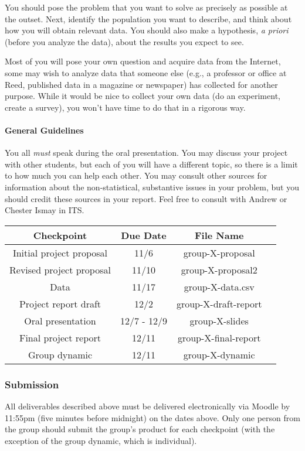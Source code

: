 \documentclass[10pt]{article}
\begin{document}
	You should pose the problem that you want to solve as precisely as possible at the outset. Next, identify the population you want to describe, and think about how you will obtain relevant data. You should also make a hypothesis, \emph{a priori} (before you analyze the data), about the results you expect to see.

	Most of you will pose your own question and acquire data from the Internet, some may wish to analyze data that someone else (e.g., a professor or office at Reed, published data in a magazine or newspaper) has collected for another purpose. While it would be nice to collect your own data (do an experiment, create a survey), you won't have time to do that in a rigorous way.
	
\paragraph{General Guidelines}
You all \emph{must} speak during the oral presentation. You may discuss your project with other students, but each of you will have a different topic, so there is a limit to how much you can help each other. You may consult other sources for information about the non-statistical, substantive issues in your problem, but you should credit these sources in your report. Feel free to consult with Andrew or Chester Ismay in ITS.

\newpage

\begin{table}
	\centering
\begin{tabular}{cccl}
	Checkpoint		&	Due Date	&	File Name \\
	\hline
	Initial project proposal	& 11/6 	&  group-X-proposal \\
	Revised project proposal	& 11/10	& group-X-proposal2 \\
	Data & 11/17	& group-X-data.csv \\
	Project report draft & 12/2 & group-X-draft-report \\
	Oral presentation	& 12/7 - 12/9	& group-X-slides \\
	Final project report	& 12/11	& group-X-final-report \\
	Group dynamic	& 12/11	& group-X-dynamic \\
	\hline
\end{tabular}
\end{table}

\subsubsection*{Submission}
All deliverables described above must be delivered electronically via Moodle by 11:55pm (five minutes before midnight) on the dates above. Only one person from the group should submit the group's product for each checkpoint (with the exception of the group dynamic, which is individual).
\end{document}
